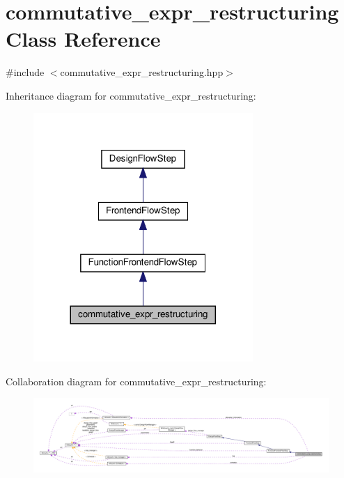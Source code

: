 \hypertarget{classcommutative__expr__restructuring}{}\section{commutative\+\_\+expr\+\_\+restructuring Class Reference}
\label{classcommutative__expr__restructuring}


{\ttfamily \#include $<$commutative\+\_\+expr\+\_\+restructuring.\+hpp$>$}



Inheritance diagram for commutative\+\_\+expr\+\_\+restructuring\+:
\nopagebreak
\begin{figure}[H]
\begin{center}
\leavevmode
\includegraphics[width=236pt]{de/d36/classcommutative__expr__restructuring__inherit__graph}
\end{center}
\end{figure}


Collaboration diagram for commutative\+\_\+expr\+\_\+restructuring\+:
\nopagebreak
\begin{figure}[H]
\begin{center}
\leavevmode
\includegraphics[width=350pt]{d7/d70/classcommutative__expr__restructuring__coll__graph}
\end{center}
\end{figure}
